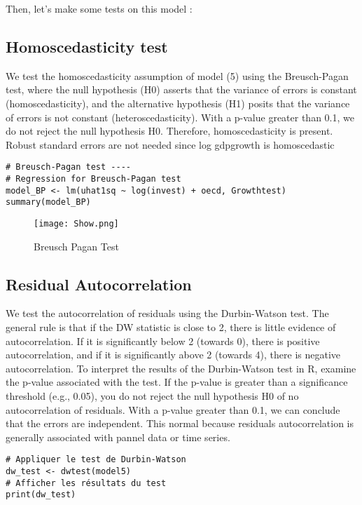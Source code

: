 \documentclass[12pt,fleqn]{report}
\begin{document}
Then, let's make some tests on this model :
\subsection*{Homoscedasticity test}
We test the homoscedasticity assumption of model (5) using the Breusch-Pagan test, where the null hypothesis (H0) asserts that the variance of errors is constant (homoscedasticity), and the alternative hypothesis (H1) posits that the variance of errors is not constant (heteroscedasticity). With a p-value greater than 0.1, we do not reject the null hypothesis H0. Therefore, homoscedasticity is present. Robust standard errors are not needed since log gdpgrowth is homoscedastic 
\begin{lstlisting}
# Breusch-Pagan test ----
# Regression for Breusch-Pagan test
model_BP <- lm(uhat1sq ~ log(invest) + oecd, Growthtest)
summary(model_BP)
\end{lstlisting}

\begin{figure}[h]
  \texttt{[image: Show.png]}
  \caption{Breusch Pagan Test}
  \label{fig:label_figure}
\end{figure}
\subsection*{Residual Autocorrelation}
We test the autocorrelation of residuals using the Durbin-Watson test. The general rule is that if the DW statistic is close to 2, there is little evidence of autocorrelation. If it is significantly below 2 (towards 0), there is positive autocorrelation, and if it is significantly above 2 (towards 4), there is negative autocorrelation. To interpret the results of the Durbin-Watson test in R, examine the p-value associated with the test. If the p-value is greater than a significance threshold (e.g., 0.05), you do not reject the null hypothesis H0 of no autocorrelation of residuals.
With a p-value greater than 0.1, we can conclude that the errors are independent. This normal because residuals autocorrelation is generally associated with pannel data or time series.
\begin{lstlisting}
# Appliquer le test de Durbin-Watson
dw_test <- dwtest(model5)
# Afficher les résultats du test
print(dw_test)
\end{lstlisting}
\end{document}
